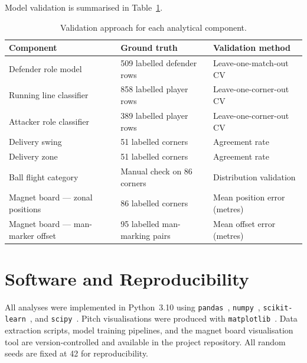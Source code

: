 Model validation is summarised in Table~\ref{tab:validation}.

\begin{table}[h]
  \centering
  \caption{Validation approach for each analytical component.}
  \label{tab:validation}
  \begin{tabular}{p{4cm}p{4cm}p{4.5cm}}
    \toprule
    \textbf{Component} & \textbf{Ground truth} & \textbf{Validation method} \\
    \midrule
    Defender role model & 509 labelled defender rows & Leave-one-match-out CV \\
    Running line classifier & 858 labelled player rows & Leave-one-corner-out CV \\
    Attacker role classifier & 389 labelled player rows & Leave-one-corner-out CV \\
    Delivery swing & 51 labelled corners & Agreement rate \\
    Delivery zone & 51 labelled corners & Agreement rate \\
    Ball flight category & Manual check on 86 corners & Distribution validation \\
    Magnet board — zonal positions & 86 labelled corners & Mean position error (metres) \\
    Magnet board — man-marker offset & 95 labelled man-marking pairs & Mean offset error (metres) \\
    \bottomrule
  \end{tabular}
\end{table}

\section{Software and Reproducibility}
\label{sec:software}

All analyses were implemented in Python~3.10 using
\texttt{pandas}~\citep{pandas2020},
\texttt{numpy}~\citep{numpy2020},
\texttt{scikit-learn}~\citep{sklearn2011},
and \texttt{scipy}~\citep{scipy2020}.
Pitch visualisations were produced with \texttt{matplotlib}~\citep{matplotlib2007}.
Data extraction scripts, model training pipelines, and the magnet board
visualisation tool are version-controlled and available in the project repository.
All random seeds are fixed at 42 for reproducibility.

